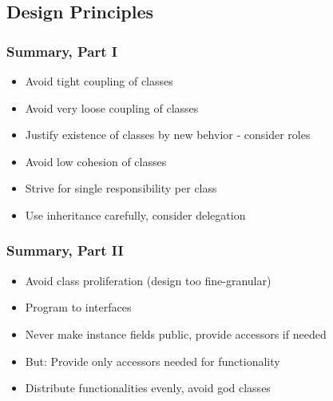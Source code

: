 \subsection{Design Principles}
\subsubsection*{Summary, Part I}
\begin{defBox}
    \begin{itemize}
        \item Avoid tight coupling of classes
        \item Avoid very loose coupling of classes
        \item Justify existence of classes by new behvior - consider roles
        \item Avoid low cohesion of classes
        \item Strive for single responsibility per class
        \item Use inheritance carefully, consider delegation
    \end{itemize}
\end{defBox}
\subsubsection*{Summary, Part II}
\begin{defBox}
    \begin{itemize}
        \item Avoid class proliferation (design too fine-granular)
        \item Program to interfaces
        \item Never make instance fields public, provide accessors if needed
        \item But: Provide only accessors needed for functionality
        \item Distribute functionalities evenly, avoid god classes
    \end{itemize}
\end{defBox}